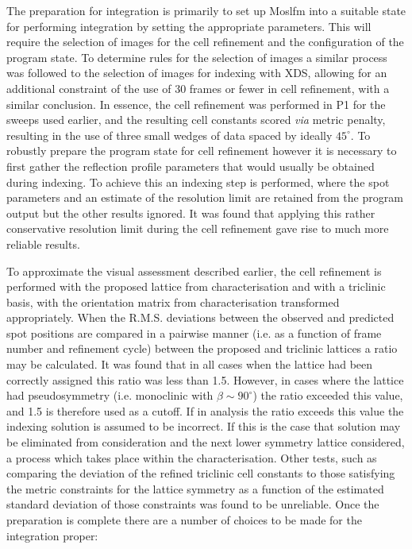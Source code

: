 \documentclass[preprint,pdf]{iucr}
\begin{document}
The preparation for integration is primarily to set up Moslfm into
a suitable state for performing integration by setting the appropriate
parameters. This will require the
selection of images for the cell refinement and
the configuration of the program state. To determine rules for the
selection of images a similar process was followed to the selection of
images for indexing with XDS, allowing for an additional constraint of
the use of 30 frames or fewer in cell refinement, with a similar
conclusion. In essence, the cell refinement was performed in P1 for the
sweeps used earlier, and the resulting cell constants scored
\emph{via} metric penalty, resulting in the use of three small wedges
of data spaced by ideally $45^{\circ}$. To robustly prepare the program state
for cell refinement however it is necessary to first gather the
reflection profile parameters that would usually be obtained during
indexing. To achieve this an indexing step is
performed, where the spot parameters and an estimate of the resolution
limit are retained from the program output
but the other results ignored. It was found that
applying this rather conservative
resolution limit during the cell refinement gave rise to
much more reliable results.

To approximate the visual assessment described earlier, the cell
refinement is performed with the proposed lattice from
characterisation and with a triclinic 
basis, with the orientation matrix from
characterisation transformed appropriately. When the R.M.S. deviations
between the observed and predicted spot positions are compared in a
pairwise manner (i.e. as a function of frame number and refinement
cycle) between the proposed and triclinic lattices
a ratio may be calculated. It was found that in
all cases when the lattice had been correctly assigned this ratio was
less than 1.5. However, in cases where the lattice had pseudosymmetry
(i.e. monoclinic with $\beta \sim 90^{\circ}$)
the ratio exceeded this value, and 1.5 is therefore used as a
cutoff. If in analysis the ratio exceeds this value the indexing
solution is assumed to be incorrect. If this is the case that solution may be
eliminated from consideration and the next lower symmetry lattice
considered, a process which takes place within the characterisation.
Other tests, such as comparing the deviation of the refined triclinic
cell constants to those satisfying the metric constraints for the 
lattice symmetry as a function
of the estimated standard deviation of those constraints was found to
be unreliable. Once the preparation is complete there are a number of
choices to be made for the integration proper:
\end{document}
